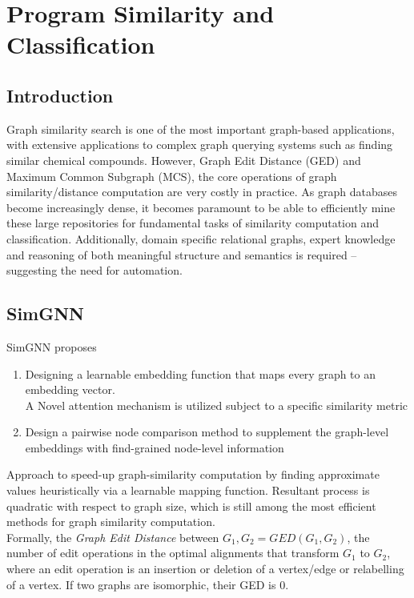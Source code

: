 \documentclass{article}
\begin{document}
\section{Program Similarity and Classification}
\label{similarity}
\subsection{Introduction}

Graph similarity search is one of the most important graph-based applications, with extensive applications to complex graph querying systems such as finding similar chemical compounds.
However, Graph Edit Distance (GED) and Maximum Common Subgraph (MCS), the core operations of graph similarity/distance computation are very costly in practice.
As graph databases become increasingly dense, it becomes paramount to be able to efficiently mine these large repositories for fundamental tasks of similarity computation and classification.
Additionally, domain specific relational graphs, expert knowledge and reasoning of both meaningful structure and semantics is required – suggesting the need for automation.

\subsection{SimGNN}
SimGNN \cite{bai2019simgnn} proposes
\begin{enumerate}
    \item Designing a learnable embedding function that maps every graph to an embedding vector.\\
        A Novel attention mechanism is utilized subject to a specific similarity metric
    \item Design a pairwise node comparison method to supplement the graph-level embeddings with find-grained node-level information
\end{enumerate}
Approach to speed-up graph-similarity computation by finding approximate values heuristically via a learnable mapping function. Resultant process is quadratic with respect to graph size, which is still among the most efficient methods for graph similarity computation.\\

Formally, the \textit{Graph Edit Distance} between $G_1, G_2 = GED(G_1, G_2)$, the number of edit operations in the optimal alignments that transform $G_1$ to $G_2$, where an edit operation is an insertion or deletion of a vertex/edge or relabelling of a vertex.
If two graphs are isomorphic, their GED is 0.\\
\end{document}
